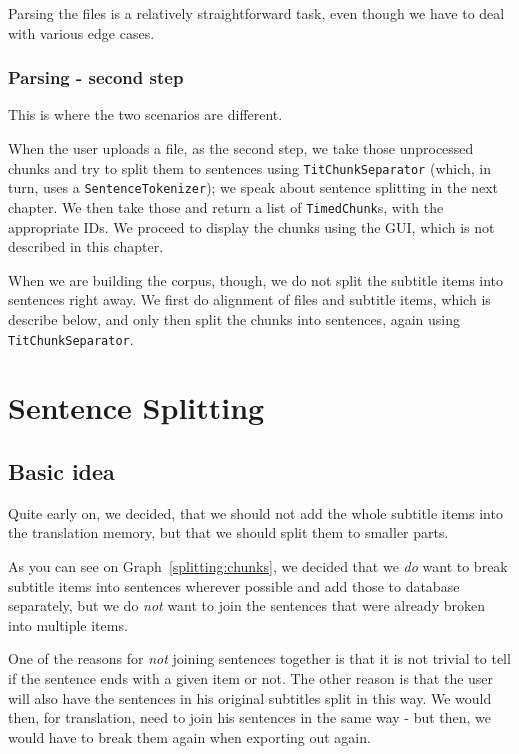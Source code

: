 Parsing the files is a relatively straightforward task, even though we have to deal with various edge cases.

\subsubsection*{Parsing - second step}
This is where the two scenarios are different. 

When the user uploads a file, as the second step, we take those unprocessed chunks and try to split them to sentences using \texttt{TitChunkSeparator} (which, in turn, uses a \texttt{SentenceTokenizer}); we speak about sentence splitting in the next chapter. We then take those and return a list of \texttt{TimedChunk}s, with the appropriate IDs. We proceed to display the chunks using the GUI, which is not described in this chapter.

When we are building the corpus, though, we do not split the subtitle items into sentences right away. We first do alignment of files and subtitle items, which is describe below, and only then split the chunks into sentences, again using \texttt{TitChunkSeparator}.

\section{Sentence Splitting}
\label{sentence_splitting}
\subsection*{Basic idea}
Quite early on, we decided, that we should not add the whole subtitle items into the translation memory, but that we should split them to smaller parts.

As you can see on Graph~\ref{splitting:chunks}, we decided that we \emph{do} want to break subtitle items into sentences wherever possible and add those to database separately, but we do \emph{not} want to join the sentences that were already broken into multiple items.

One of the reasons for \emph{not} joining sentences together is that it is not trivial to tell if the sentence ends with a given item or not. The other reason is that the user will also have the sentences in his original subtitles split in this way. We would then, for translation, need to join his sentences in the same way - but then, we would have to break them again when exporting out again.


